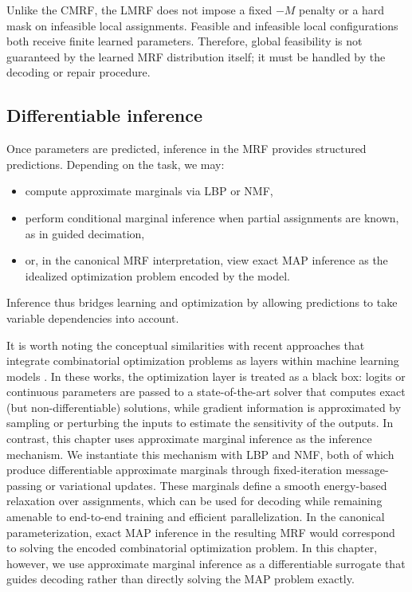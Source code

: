 Unlike the CMRF, the LMRF does not impose a fixed $-M$ penalty or a hard mask on infeasible local assignments. Feasible and infeasible local configurations both receive finite learned parameters. Therefore, global feasibility is not guaranteed by the learned MRF distribution itself; it must be handled by the decoding or repair procedure.

\subsection{Differentiable inference}
\label{subsec:chapter_3_differentiable_inference}

Once parameters are predicted, inference in the MRF provides structured predictions. Depending on the task, we may:
\begin{itemize}
    \item compute approximate marginals via LBP or NMF,
    \item perform conditional marginal inference when partial assignments are known, as in guided decimation,
    \item or, in the canonical MRF interpretation, view exact MAP inference as the idealized optimization problem encoded by the model.
\end{itemize}
Inference thus bridges learning and optimization by allowing predictions to take variable dependencies into account.

It is worth noting the conceptual similarities with recent approaches that integrate combinatorial optimization problems as layers within machine learning models \citep{berthet_learning_2020,dalle_learning_2022}. In these works, the optimization layer is treated as a black box: logits or continuous parameters are passed to a state-of-the-art solver that computes exact (but non-differentiable) solutions, while gradient information is approximated by sampling or perturbing the inputs to estimate the sensitivity of the outputs. In contrast, this chapter uses approximate marginal inference as the inference mechanism. We instantiate this mechanism with LBP and NMF, both of which produce differentiable approximate marginals through fixed-iteration message-passing or variational updates. These marginals define a smooth energy-based relaxation over assignments, which can be used for decoding while remaining amenable to end-to-end training and efficient parallelization. In the canonical parameterization, exact MAP inference in the resulting MRF would correspond to solving the encoded combinatorial optimization problem. In this chapter, however, we use approximate marginal inference as a differentiable surrogate that guides decoding rather than directly solving the MAP problem exactly.

